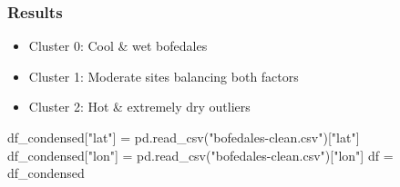 \documentclass[
  letterpaper,
  DIV=11,
  numbers=noendperiod]{scrreprt}
\newenvironment{Shaded}{\begin{snugshade}}{\end{snugshade}}
\newcommand{\NormalTok}[1]{\textcolor[rgb]{0.00,0.23,0.31}{#1}}
\newcommand{\OperatorTok}[1]{\textcolor[rgb]{0.37,0.37,0.37}{#1}}
\newcommand{\StringTok}[1]{\textcolor[rgb]{0.13,0.47,0.30}{#1}}
\providecommand{\tightlist}{%
  \setlength{\itemsep}{0pt}\setlength{\parskip}{0pt}}
\begin{document}
\subsubsection{Results}\label{results}

\begin{itemize}
\tightlist
\item
  Cluster 0: Cool \& wet bofedales
\item
  Cluster 1: Moderate sites balancing both factors
\item
  Cluster 2: Hot \& extremely dry outliers
\end{itemize}

\begin{Shaded}
\begin{Highlighting}[]
\NormalTok{df\_condensed[}\StringTok{"lat"}\NormalTok{] }\OperatorTok{=}\NormalTok{ pd.read\_csv(}\StringTok{"bofedales{-}clean.csv"}\NormalTok{)[}\StringTok{"lat"}\NormalTok{]}
\NormalTok{df\_condensed[}\StringTok{"lon"}\NormalTok{] }\OperatorTok{=}\NormalTok{ pd.read\_csv(}\StringTok{"bofedales{-}clean.csv"}\NormalTok{)[}\StringTok{"lon"}\NormalTok{]}
\NormalTok{df }\OperatorTok{=}\NormalTok{ df\_condensed}
\end{Highlighting}
\end{Shaded}
\end{document}
